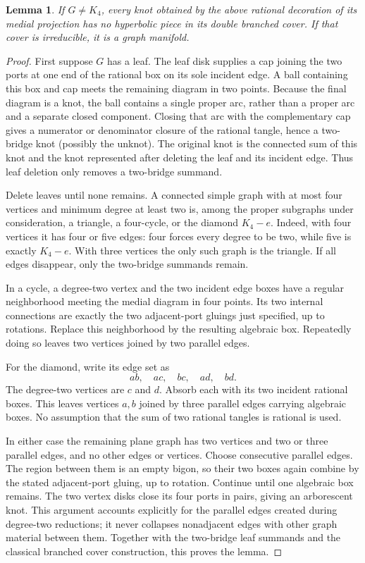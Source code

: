 \documentclass[11pt]{article}
\newtheorem{lemma}[theorem]{Lemma}
\begin{document}
\begin{lemma}\label{lem:proper}
If $G\ne K_4$, every knot obtained by the above rational decoration
of its medial projection has no hyperbolic piece in its double
branched cover. If that cover is irreducible, it is a graph manifold.
\end{lemma}
\begin{proof}
First suppose $G$ has a leaf. The leaf disk supplies a cap joining the
two ports at one end of the rational box on its sole incident edge.
A ball containing this box and cap meets the remaining diagram in two
points. Because the final diagram is a knot, the ball contains a single
proper arc, rather than a proper arc and a separate closed component.
Closing that arc with the complementary cap gives a numerator or
denominator closure of the rational tangle, hence a two-bridge knot
(possibly the unknot). The original knot is the connected sum of this
knot and the knot represented after deleting the leaf and its incident
edge. Thus leaf deletion only removes a two-bridge summand.

Delete leaves until none remains. A connected simple graph with at most
four vertices and minimum degree at least two is, among the proper
subgraphs under consideration, a triangle, a four-cycle, or the diamond
$K_4-e$. Indeed, with four vertices it has four or five edges:
four forces every degree to be two, while five is exactly $K_4-e$.
With three vertices the only such graph is the triangle.
If all edges disappear, only the two-bridge summands remain.

In a cycle, a degree-two vertex and the two incident edge boxes have a
regular neighborhood meeting the medial diagram in four points.
Its two internal connections are exactly the two adjacent-port gluings
just specified, up to rotations. Replace this neighborhood by the
resulting algebraic box. Repeatedly doing so leaves two vertices joined
by two parallel edges.

For the diamond, write its edge set as
\[
                 ab,\quad ac,\quad bc,\quad ad,\quad bd.
\]
The degree-two vertices are $c$ and $d$. Absorb each with its two
incident rational boxes. This leaves vertices $a,b$ joined by three
parallel edges carrying algebraic boxes. No assumption that the sum
of two rational tangles is rational is used.

In either case the remaining plane graph has two vertices and two or
three parallel edges, and no other edges or vertices.
Choose consecutive parallel edges. The region between them is an empty
bigon, so their two boxes again combine by the stated adjacent-port
gluing, up to rotation. Continue until one algebraic box remains.
The two vertex disks close its four ports in pairs, giving an
arborescent knot. This argument accounts explicitly for the parallel
edges created during degree-two reductions; it never collapses
nonadjacent edges with other graph material between them.
Together with the two-bridge leaf summands and the classical branched
cover construction, this proves the lemma.
\end{proof}
\end{document}

